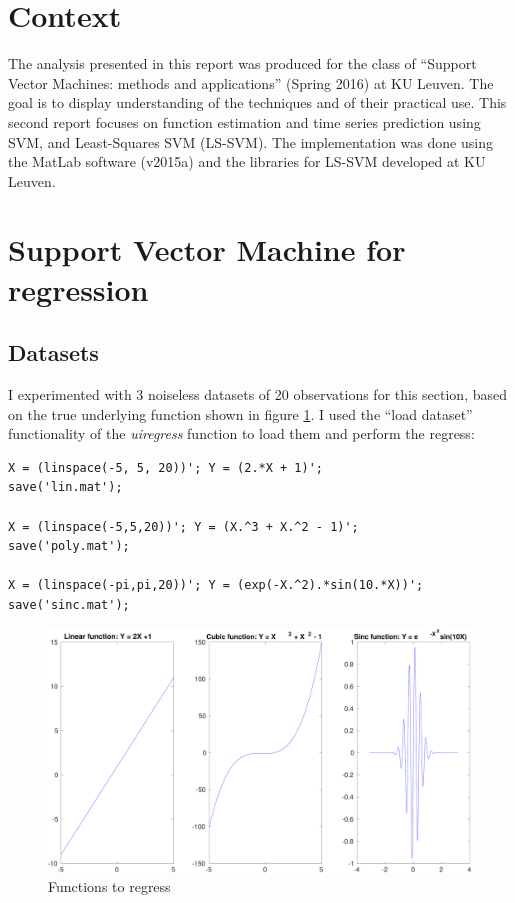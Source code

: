 \documentclass[11pt, a4paper]{article}
\begin{document}

\tableofcontents
\newpage

\section*{Context}

The analysis presented in this report was produced for the class of
``Support Vector Machines: methods and applications'' (Spring 2016) at
KU Leuven. The goal is to display understanding of the techniques and
of their practical use. This second report focuses on function
estimation and time series prediction using SVM, and Least-Squares SVM
(LS-SVM). The implementation was done using the MatLab software
(v2015a) and the libraries for LS-SVM developed at KU Leuven.

\section{Support Vector Machine for regression}

\subsection{Datasets}
I experimented with 3 noiseless datasets of 20 observations for this
section, based on the true underlying function shown in figure
\ref{fig:regress_datasets}. I used the ``load dataset'' functionality
of the \emph{uiregress} function to load them and perform the regress:

\begin{lstlisting}
X = (linspace(-5, 5, 20))'; Y = (2.*X + 1)';
save('lin.mat');

X = (linspace(-5,5,20))'; Y = (X.^3 + X.^2 - 1)';
save('poly.mat');

X = (linspace(-pi,pi,20))'; Y = (exp(-X.^2).*sin(10.*X))';
save('sinc.mat');
\end{lstlisting}

\begin{figure}[H]
    \centering
    \includegraphics[scale=.40]{datasets.pdf}
    \caption{Functions to regress}
    \label{fig:regress_datasets}
\end{figure}
\end{document}
